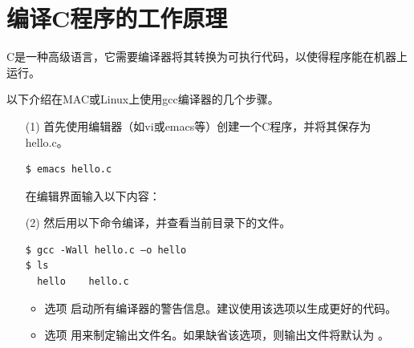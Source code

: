 \section{编译C程序的工作原理}
\begin{frame}\ft{\secname}
  C是一种高级语言，它需要编译器将其转换为可执行代码，以使得程序能在机器上运行。 

  以下介绍在MAC或Linux上使用gcc编译器的几个步骤。

\end{frame}


\begin{frame}[fragile]\ft{\secname}
  \begin{itemize}

  \item[(1)] 首先使用编辑器（如vi或emacs等）创建一个C程序，并将其保存为hello.c。

    \begin{lstlisting}
$ emacs hello.c
    \end{lstlisting}
  \end{itemize}
\end{frame}

\begin{frame}[fragile]\ft{\secname}
  \begin{itemize}
  \item[] 
    在编辑界面输入以下内容：
    

  \end{itemize}
\end{frame}

\begin{frame}[fragile]\ft{\secname}
  \begin{itemize}
  \item[(2)] 然后用以下命令编译，并查看当前目录下的文件。
    \begin{lstlisting}[backgroundcolor=\color{red!10}]
$ gcc -Wall hello.c –o hello
$ ls
  hello    hello.c
\end{lstlisting}

\begin{itemize}
\item 选项  启动所有编译器的警告信息。建议使用该选项以生成更好的代码。
\item 选项  用来制定输出文件名。如果缺省该选项，则输出文件将默认为 。
\end{itemize}
    
  \end{itemize}
\end{frame}

